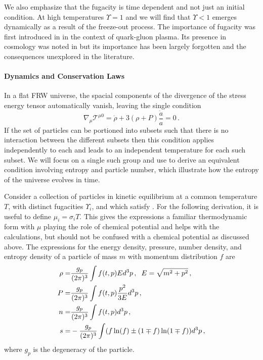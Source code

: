  We also emphasize that the fugacity is time dependent and not just an initial condition.  At high temperatures $\Upsilon=1$ and we will find that $\Upsilon<1$ emerges dynamically as a result of the freeze-out process. The importance of fugacity was first introduced in \cite{Rafelski:1982pu} in the context of quark-gluon plasma.  Its presence in cosmology was noted in  \cite{Bernstein:1985th,Dolgov:1992wf} but its importance has been largely forgotten and the consequences unexplored in the literature.  

\paragraph{Dynamics and Conservation Laws}
In a flat FRW universe, the spacial components of the divergence of the stress energy tensor automatically vanish, leaving the single condition
\begin{equation}\label{stress_energy_eq}
\nabla_\mu \mathcal{T}^{\mu 0}=\dot{\rho}+3\left(\rho+P\right)\frac{\dot{a}}{a}=0\,.
\end{equation}
If the set of particles can be portioned into subsets such that there is no interaction between the different subsets then this condition applies independently to each and leads to an independent temperature for each such subset.  We will focus on a single such group and use   to derive an equivalent condition involving entropy and particle number, which illustrate how the entropy of the universe evolves in time. 

Consider a  collection of particles in kinetic equilibrium at a common temperature $T$, with distinct fugacities $\Upsilon_i$, and  which satisfy .   For the following derivation, it is useful to define $\mu_i=\sigma_i T$.  This gives the expressions a familiar thermodynamic form with $\mu$ playing the role of chemical potential and helps with the calculations, but should not be confused with a chemical potential as discussed above.  The expressions for the  energy density, pressure, number density, and entropy density of a particle of mass $m$ with momentum distribution $f$ are
\begin{align}\label{moments}
\rho=&\frac{g_p}{(2\pi)^3}\int f(t,p)Ed^3p\,, \hspace{2mm} E=\sqrt{m^2+p^2}\,,\\
P=&\frac{g_p}{(2\pi)^3}\int f(t,p)\frac{p^2}{3E}d^3p\,,\\
n=&\frac{g_p}{(2\pi)^3}\int f(t,p) d^3p\,,\\
s=&-\frac{g_p}{(2\pi)^3}\int (f\ln(f)\pm(1\mp f)\ln(1\mp f)) d^3p\,,
\end{align}
where $g_p$ is the degeneracy of the particle.

